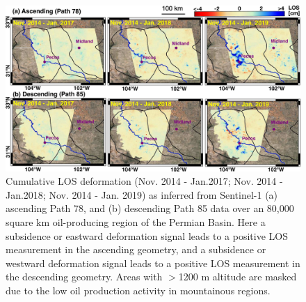 \begin{figure}
	\centering
	\includegraphics[width=.99\linewidth]{figures/chapter4-grl/figure3-los-insar-small.pdf}
	\caption[Cumulative LOS deformation for Path 78 and Path 85]{Cumulative LOS deformation (Nov. 2014 - Jan.2017; Nov. 2014 - Jan.2018; Nov. 2014 - Jan. 2019) as inferred from Sentinel-1 (a) ascending Path 78, and (b) descending Path 85 data over an 80,000 square km oil-producing region of the Permian Basin. Here a subsidence or eastward deformation signal leads to a positive LOS measurement in the ascending geometry, and a subsidence or westward deformation signal leads to a positive LOS measurement in the descending geometry. Areas with $>$1200 m altitude are masked due to the low oil production activity in mountainous regions.}
	\label{fig:ch4-insar-los}
\end{figure}




